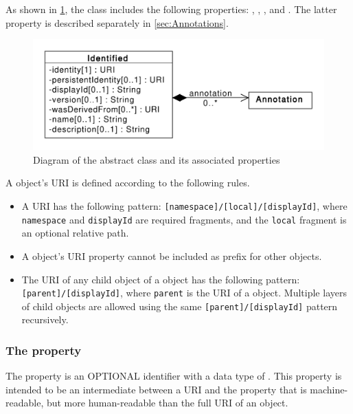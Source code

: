 As shown in \ref{uml:identified}, the  class includes the following properties: , , , and . The latter property is described separately in \ref{sec:Annotations}. 

\begin{figure}[ht]
\begin{center}
\includegraphics[scale=0.6]{uml/identified}
\caption[]{Diagram of the  abstract class and its associated properties}
\label{uml:identified}
\end{center}
\end{figure}

A  object's URI is defined according to the following rules.

\begin{itemize}
 \item A  URI has the following pattern:
  \texttt{[namespace]/[local]/[displayId]},  where \texttt{namespace} and \texttt{displayId} are required fragments, and the \texttt{local} fragment is an optional relative path. 
  \item A  object's URI property cannot be included as prefix for other  objects.
  \item The URI of any child object of a  object has the following pattern:\\\texttt{[parent]/[displayId]}, where \texttt{parent} is the URI of a  object.  Multiple layers of child objects are allowed using the same \texttt{[parent]/[displayId]} pattern recursively.
  \end{itemize}
  
\subsubsection*{The  property}
\label{sec:displayId}
The  property is an OPTIONAL identifier with a data type of . This property is intended to be an intermediate between a URI and the  property that is machine-readable, but more human-readable than the full URI of an object.

